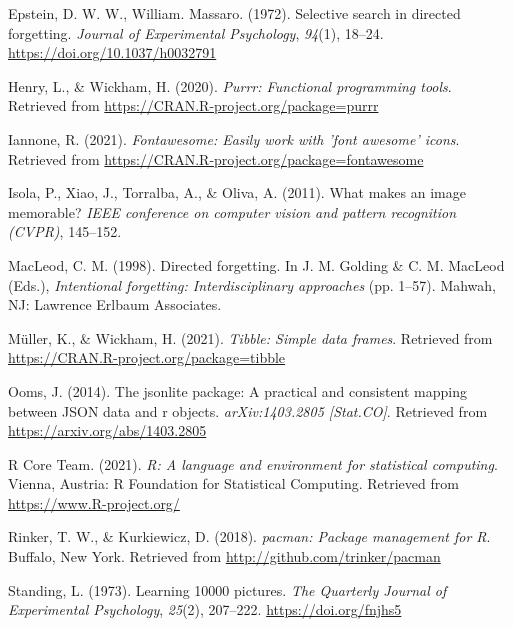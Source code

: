 \documentclass[
  man,floatsintext]{apa6}
\newlength{\cslhangindent}
\newlength{\cslentryspacingunit} %
\newenvironment{CSLReferences}[2] %
 {%
  \setlength{\parindent}{0pt}
  \ifodd #1
  \let\oldpar\par
  \def\par{\hangindent=\cslhangindent\oldpar}
  \fi
  \setlength{\parskip}{#2\cslentryspacingunit}
 }%
 {}
\begin{document}
\begin{CSLReferences}{1}{0}
\leavevmode{}%
Epstein, D. W. W., William. Massaro. (1972). Selective search in directed forgetting. \emph{Journal of Experimental Psychology}, \emph{94}(1), 18--24. \url{https://doi.org/10.1037/h0032791}

\leavevmode{}%
Henry, L., \& Wickham, H. (2020). \emph{Purrr: Functional programming tools}. Retrieved from \url{https://CRAN.R-project.org/package=purrr}

\leavevmode{}%
Iannone, R. (2021). \emph{Fontawesome: Easily work with 'font awesome' icons}. Retrieved from \url{https://CRAN.R-project.org/package=fontawesome}

\leavevmode{}%
Isola, P., Xiao, J., Torralba, A., \& Oliva, A. (2011). What makes an image memorable? \emph{IEEE conference on computer vision and pattern recognition (CVPR)}, 145--152.

\leavevmode{}%
MacLeod, C. M. (1998). Directed forgetting. In J. M. Golding \& C. M. MacLeod (Eds.), \emph{Intentional forgetting: {Interdisciplinary} approaches} (pp. 1--57). {Mahwah, NJ}: {Lawrence Erlbaum Associates}.

\leavevmode{}%
Müller, K., \& Wickham, H. (2021). \emph{Tibble: Simple data frames}. Retrieved from \url{https://CRAN.R-project.org/package=tibble}

\leavevmode{}%
Ooms, J. (2014). The jsonlite package: A practical and consistent mapping between JSON data and r objects. \emph{arXiv:1403.2805 {[}Stat.CO{]}}. Retrieved from \url{https://arxiv.org/abs/1403.2805}

\leavevmode{}%
R Core Team. (2021). \emph{R: A language and environment for statistical computing}. Vienna, Austria: R Foundation for Statistical Computing. Retrieved from \url{https://www.R-project.org/}

\leavevmode{}%
Rinker, T. W., \& Kurkiewicz, D. (2018). \emph{{pacman}: {P}ackage management for {R}}. Buffalo, New York. Retrieved from \url{http://github.com/trinker/pacman}

\leavevmode{}%
Standing, L. (1973). Learning 10000 pictures. \emph{The Quarterly Journal of Experimental Psychology}, \emph{25}(2), 207--222. \url{https://doi.org/fnjhs5}


\end{CSLReferences}
\end{document}

